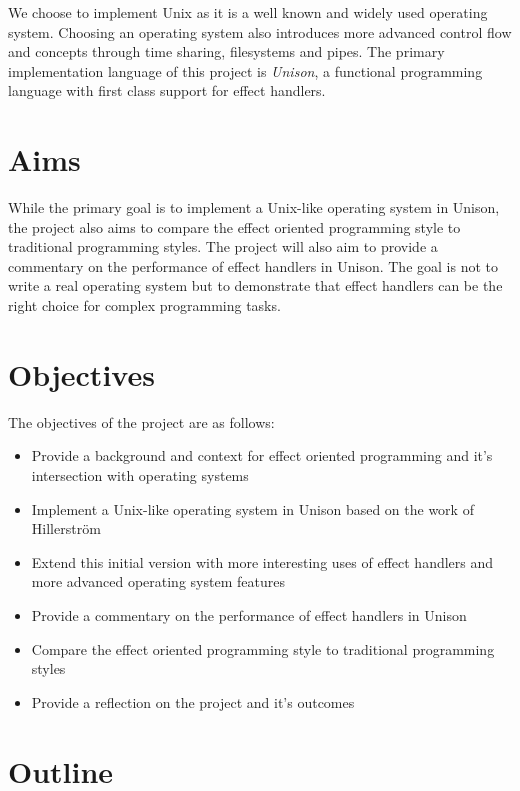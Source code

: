 \documentclass[logo,bsc,singlespacing,parskip]{infthesis}
\begin{document}
We choose to implement Unix as it is a well known and widely used operating
system. Choosing an operating system also introduces more advanced control flow
and concepts through time sharing, filesystems and pipes. The primary
implementation language of this project is \emph{Unison}, a functional
programming language with first class support for effect handlers.

\section{Aims}

While the primary goal is to implement a Unix-like operating system in Unison,
the project also aims to compare the effect oriented programming style to
traditional programming styles. The project will also aim to provide a
commentary on the performance of effect handlers in Unison. The goal is not to
write a real operating system but to demonstrate that effect handlers can be
the right choice for complex programming tasks. 

\section{Objectives}

The objectives of the project are as follows:

\begin{itemize}
  \item{Provide a background and context for effect oriented programming and it's intersection with operating systems}
  \item{Implement a Unix-like operating system in Unison based on the work of Hillerstr\"{o}m \cite{hillerstrom2022foundations}}
  \item{Extend this initial version with more interesting uses of effect handlers and more advanced operating system features}
  \item{Provide a commentary on the performance of effect handlers in Unison}
  \item{Compare the effect oriented programming style to traditional programming styles}
  \item{Provide a reflection on the project and it's outcomes}
\end{itemize}

\section{Outline}
\end{document}
